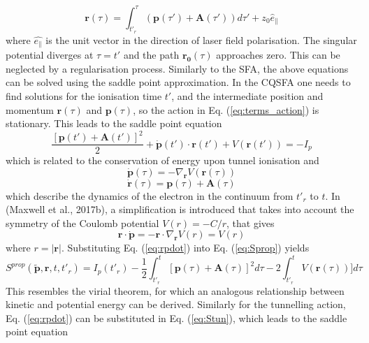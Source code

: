 \documentclass[11pt]{article}
\numberwithin{equation}{section}
\begin{document}
\begin{equation}
    \mathbf{r}(\tau) =  \int_{t'_r}^\tau \left ( \mathbf{p}(\tau ') + \mathbf{A}(\tau ')\right ) d\tau ' + z_0\hat{e}_\parallel
\end{equation}
where $\hat{e_\parallel}$ is the unit vector in the direction of laser field polarisation. The singular potential diverges at $\tau = t'$ and the path $\mathbf{r_0}(\tau)$ approaches zero. This can be neglected by a regularisation process\cite{popruzhenko_2008_strong}.
\newline
Similarly to the SFA, the above equations can be solved using the saddle point approximation. In the CQSFA one needs to find solutions for the ionisation time $t'$, and the intermediate position and momentum $\mathbf{r}(\tau)$ and $\mathbf{p}(\tau)$, so the action in Eq. (\ref{eq:terms_action}) is stationary. This leads to the saddle point equation
\begin{equation}
    \frac{[\mathbf{p}(t') + \mathbf{A}(t')]^2}{2} + \dot{\mathbf{p}}(t') \cdot \mathbf{r}(t') + V(\mathbf{r}(t')) = -I_p
\end{equation}
which is related to the conservation of energy upon tunnel ionisation and 
\begin{equation}\label{eq:pdot}
     \dot{\textbf{p}}(\tau)=-\nabla_{\textbf{r}}V(\textbf{r}(\tau))
\end{equation}
\begin{equation}\label{eq:rdot}
     \dot{\textbf{r}}(\tau)=\textbf{p}(\tau)+\textbf{A}(\tau)
\end{equation}
which describe the dynamics of the electron in the continuum from $t'_r$ to $t$.
\newline
In (Maxwell et al., 2017b)\cite{maxwell_2017_coulombcorrected}, a simplification is introduced that takes into account the symmetry of the Coulomb potential $V(r) = - C/r$, that gives
\begin{equation} \label{eq:rpdot}
    \mathbf{r} \cdot \dot{\mathbf{p}} = -\mathbf{r} \cdot \nabla_{\mathbf{r}} V(r) = V(r)
\end{equation}
where $r = |\mathbf{r}|$. Substituting Eq. (\ref{eq:rpdot}) into Eq. (\ref{eq:Sprop}) yields
\begin{equation}
    S^{prop} (\tilde{\mathbf{p}}, \mathbf{r}, t, t'_r) = I_p(t'_r) - \frac{1}{2} \int_{t'_r}^{t} [\mathbf{p}(\tau) + \mathbf{A}(\tau)]^2 d\tau - 2 \int_{t'_r}^{t} V(\mathbf{r}(\tau))] d\tau
\end{equation}
This resembles the virial theorem, for which an analogous relationship between kinetic and potential energy can be derived. Similarly for the tunnelling action, Eq. (\ref{eq:rpdot})  can be substituted in Eq. (\ref{eq:Stun}), which leads to the saddle point equation
\end{document}
